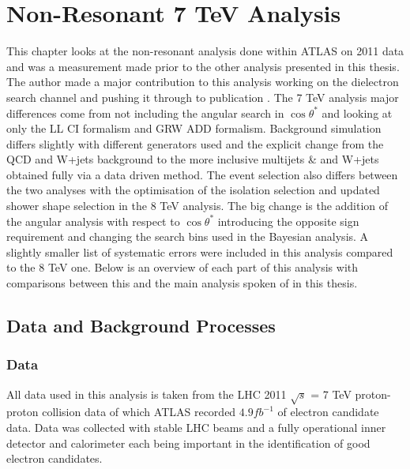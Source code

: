 \chapter{Non-Resonant 7 TeV Analysis}
\label{ch:7tev}

This chapter looks at the non-resonant analysis done within ATLAS on 2011 data and was a measurement made prior to the other analysis presented in this thesis. The author made a major contribution to this analysis working on the dielectron search channel and pushing it through to publication \cite{PhysRevD.87.015010}. 
The 7 TeV analysis major differences come from not including the angular search in $\cos{\theta^{*}}$ and looking at only the LL CI formalism and GRW ADD formalism. 
Background simulation differs slightly with different generators used and the explicit change from the QCD and W+jets background to the more inclusive multijets \& and W+jets obtained fully via a data driven method. The event selection also differs between the two analyses with the optimisation of the isolation selection and updated shower shape selection in the 8 TeV analysis. The big change is the addition of the angular analysis with respect to $\cos\theta^{*}$ introducing the opposite sign requirement and changing the search bins used in the Bayesian analysis. A slightly smaller list of systematic errors were included in this analysis compared to the 8 TeV one.
Below is an overview of each part of this analysis with comparisons between this and the main analysis spoken of in this thesis.






\section{Data and Background Processes}

\subsection*{Data}
	All data used in this analysis is taken from the LHC 2011 $\sqrt{s}$ = 7 TeV proton-proton collision data of which ATLAS recorded $4.9 fb^{-1}$ of electron candidate data. Data was collected with stable LHC beams and a fully operational inner detector and calorimeter each being important in the identification of good electron candidates.

